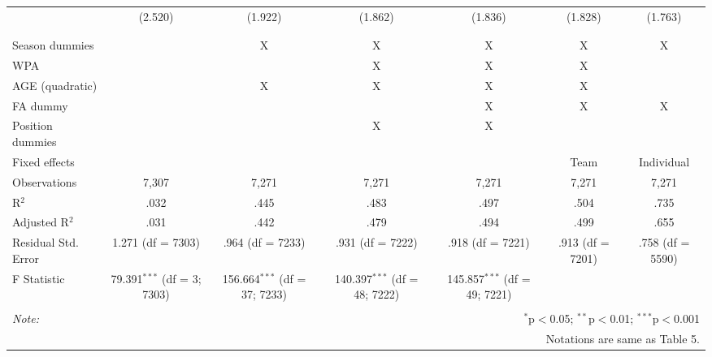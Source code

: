 \begin{table}[H]
\begin{tabular}{@{\extracolsep{5pt}}lcccccc}
  & (2.520) & (1.922) & (1.862) & (1.836) & (1.828) & (1.763) \\
  & & & & & & \\
\hline \\[-1.8ex]
Season dummies &  & X & X & X & X & X \\
WPA & & & X & X & X &  \\
AGE (quadratic) &  & X & X & X & X &  \\
FA dummy &  &  &  & X & X & X \\
Position dummies &  &  & X & X &  &  \\
Fixed effects &  &  &  &  & Team & Individual \\
Observations & 7,307 & 7,271 & 7,271 & 7,271 & 7,271 & 7,271 \\
R$^{2}$ & .032 & .445 & .483 & .497 & .504 & .735 \\
Adjusted R$^{2}$ & .031 & .442 & .479 & .494 & .499 & .655 \\
Residual Std. Error & 1.271 (df = 7303) & .964 (df = 7233) & .931 (df = 7222) & .918 (df = 7221) & .913 (df = 7201) & .758 (df = 5590) \\
F Statistic & 79.391$^{***}$ (df = 3; 7303) & 156.664$^{***}$ (df = 37; 7233) & 140.397$^{***}$ (df = 48; 7222) & 145.857$^{***}$ (df = 49; 7221) &  &  \\
\hline
\hline \\[-1.8ex]
\textit{Note:}  & \multicolumn{6}{r}{$^{*}$p$<$0.05; $^{**}$p$<$0.01; $^{***}$p$<$0.001} \\
& \multicolumn{6}{r}{Notations are same as Table 5.} \\
\end{tabular}
\end{table}
